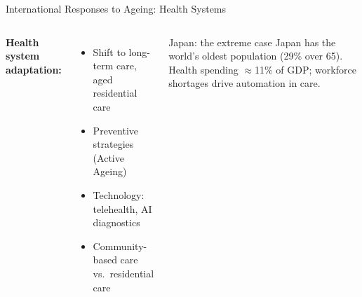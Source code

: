 \documentclass[aspectratio=169, 12pt]{beamer}
\begin{document}
\begin{frame}{International Responses to Ageing: Health Systems}
  \begin{columns}
      \textbf{Health system adaptation:}
      \begin{itemize}
        \item Shift to long-term care, aged residential care
        \item Preventive strategies (Active Ageing)
        \item Technology: telehealth, AI diagnostics
        \item Community-based care vs.\ residential care
      \end{itemize}
      \begin{alertblock}{Japan: the extreme case}
        Japan has the world's oldest population (29\% over 65). Health spending $\approx$11\%
        of GDP; workforce shortages drive automation in care.
      \end{alertblock}
  \end{columns}
\end{frame}

\end{document}

